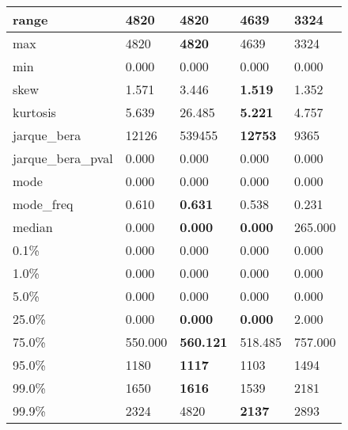 \begin{table}[H]
\begin{tabular}{|l|m{10em}|m{10em}|m{10em}|m{10em}|}
\hline range & 4820 & \bfseries 4820 & 4639 & \cellcolor[rgb]{0.9, 0.54, 0.52} 3324 \\
\hline max & 4820 & \bfseries 4820 & 4639 & \cellcolor[rgb]{0.9, 0.54, 0.52} 3324 \\
\hline min & 0.000 & 0.000 & 0.000 & 0.000 \\
\hline skew & 1.571 & \cellcolor[rgb]{0.9, 0.54, 0.52} 3.446 & \bfseries 1.519 & 1.352 \\
\hline kurtosis & 5.639 & \cellcolor[rgb]{0.9, 0.54, 0.52} 26.485 & \bfseries 5.221 & 4.757 \\
\hline jarque\_bera & 12126 & \cellcolor[rgb]{0.9, 0.54, 0.52} 539455 & \bfseries 12753 & 9365 \\
\hline jarque\_bera\_pval & 0.000 & 0.000 & 0.000 & 0.000 \\
\hline mode & 0.000 & 0.000 & 0.000 & 0.000 \\
\hline mode\_freq & 0.610 & \bfseries 0.631 & 0.538 & \cellcolor[rgb]{0.9, 0.54, 0.52} 0.231 \\
\hline median & 0.000 & \bfseries 0.000 & \bfseries 0.000 & \cellcolor[rgb]{0.9, 0.54, 0.52} 265.000 \\
\hline 0.1\% & 0.000 & 0.000 & 0.000 & 0.000 \\
\hline 1.0\% & 0.000 & 0.000 & 0.000 & 0.000 \\
\hline 5.0\% & 0.000 & 0.000 & 0.000 & 0.000 \\
\hline 25.0\% & 0.000 & \bfseries 0.000 & \bfseries 0.000 & \cellcolor[rgb]{0.9, 0.54, 0.52} 2.000 \\
\hline 75.0\% & 550.000 & \bfseries 560.121 & 518.485 & \cellcolor[rgb]{0.9, 0.54, 0.52} 757.000 \\
\hline 95.0\% & 1180 & \bfseries 1117 & 1103 & \cellcolor[rgb]{0.9, 0.54, 0.52} 1494 \\
\hline 99.0\% & 1650 & \bfseries 1616 & 1539 & \cellcolor[rgb]{0.9, 0.54, 0.52} 2181 \\
\hline 99.9\% & 2324 & \cellcolor[rgb]{0.9, 0.54, 0.52} 4820 & \bfseries 2137 & 2893 \\
\hline
\end{tabular}
\end{table}
